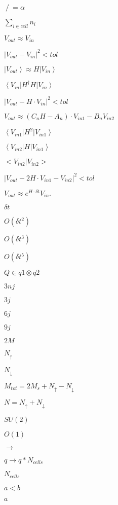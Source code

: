 \documentclass{article}
\begin{document}
$ \mathrel{/}= \alpha$
\pagebreak

$\sum_{i \in cell} n_i$
\pagebreak

$V_{out} \approx V_{in}$
\pagebreak

$\left|V_{out}-V_{in}\right|^2<tol$
\pagebreak

$\left|V_{out}\right> \approx H \left|V_{in}\right>$
\pagebreak

$\left<V_{in}\right|H^{\dagger}H\left|V_{in}\right>$
\pagebreak

$\left|V_{out} - H \cdot V_{in}\right|^2<tol$
\pagebreak

$V_{out} \approx (C_n H - A_n) \cdot V_{in1} - B_n V_{in2}$
\pagebreak

$\left<V_{in1}\right|H^2\left|V_{in1}\right>$
\pagebreak

$\left<V_{in2}\right|H\left|V_{in1}\right>$
\pagebreak

$\big<V_{in2}\big|V_{in2}\big>$
\pagebreak

$\left|V_{out} - 2H \cdot V_{in1} - V_{in2}\right|^2<tol$
\pagebreak

$V_{out} \approx e^{H \cdot \delta t} V_{in}.$
\pagebreak

$\delta t$
\pagebreak

$O(\delta t^2)$
\pagebreak

$O(\delta t^3)$
\pagebreak

$O(\delta t^5)$
\pagebreak

$Q \in q1 \otimes q2$
\pagebreak

$3nj$
\pagebreak

$3j$
\pagebreak

$6j$
\pagebreak

$9j$
\pagebreak

$2M$
\pagebreak

$N_{\uparrow}$
\pagebreak

$N_{\downarrow}$
\pagebreak

$M_{tot}=2M_{s}+N_{\uparrow}-N_{\downarrow}$
\pagebreak

$N=N_{\uparrow}+N_{\downarrow}$
\pagebreak

$SU(2)$
\pagebreak

$O(1)$
\pagebreak

$\to$
\pagebreak

$q \rightarrow q * N_{cells}$
\pagebreak

$N_{cells}$
\pagebreak

$a<b$
\pagebreak

$a$
\pagebreak
\end{document}
